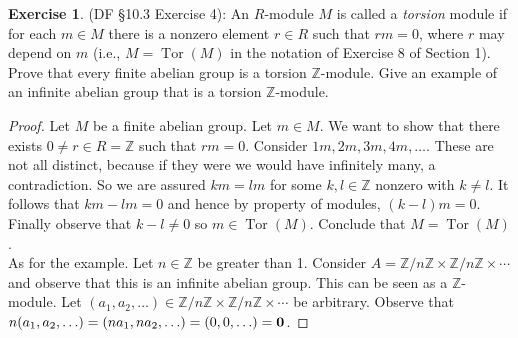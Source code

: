 \documentclass[8pt]{amsart}
\theoremstyle{plain}%
\theoremstyle{definition}
\newtheorem*{exercise}{Exercise}%
\theoremstyle{remark}
\numberwithin{equation}{section}
\newcommand{\Z}{\mathbb{Z}}
\begin{document}
\begin{exercise}
(DF \S 10.3 Exercise 4): An $R$-module $M$ is called a \textit{torsion} module if for each $m \in M$ there is a nonzero element $r \in R$ such that $rm = 0$, where $r$ may depend on $m$ (i.e., $M = \operatorname{Tor}(M)$ in the notation of Exercise 8 of Section 1). Prove that every finite abelian group is a torsion $\Z$-module. Give an example of an infinite abelian group that is a torsion $\Z$-module.
	\begin{proof}
		Let $M$ be a finite abelian group. Let $m \in M$. We want to show that there exists $0 \neq r \in R = \Z$ such that $rm = 0$. Consider $1m, 2m, 3m, 4m, \ldots$. These are not all distinct, because if they were we would have infinitely many, a contradiction. So we are assured $km = lm$ for some $k, l \in \Z$ nonzero with $k \neq l$. It follows that $km - lm = 0$ and hence by property of modules, $(k - l)m = 0$. Finally observe that $k - l \neq 0$ so $m \in \operatorname{Tor}(M)$. Conclude that $M = \operatorname{Tor}(M)$.\\

		As for the example. Let $n \in \Z$ be greater than 1. Consider $A = \Z/n\Z \times \Z/n\Z \times \cdots$ and observe that this is an infinite abelian group. This can be seen as a $\Z$-module. Let $(a_1, a_2, \ldots) \in \Z/n\Z \times \Z/n\Z \times \cdots$ be arbitrary. Observe that $n(a_1, a_2, \ldots) = (na_1, na_2, \ldots) = (0, 0, \ldots) = \textbf 0$.
	\end{proof}
\end{exercise}
\end{document}
